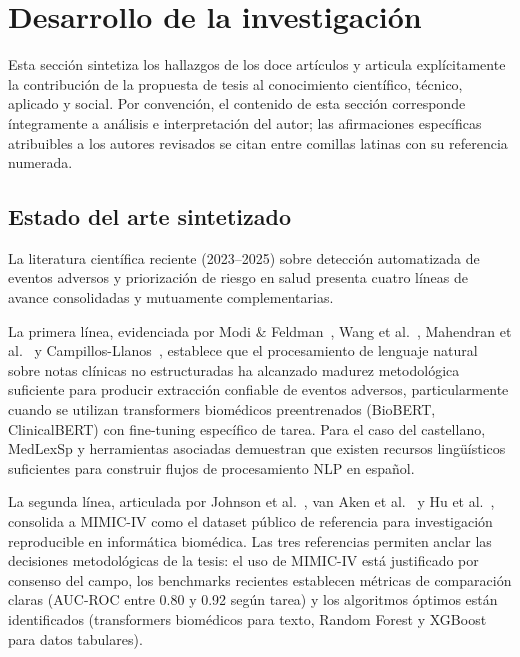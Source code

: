 \documentclass[11pt,a4paper]{article}
\begin{document}
\newpage

\section{Desarrollo de la investigación}

Esta sección sintetiza los hallazgos de los doce artículos y articula explícitamente la contribución de la propuesta de tesis al conocimiento científico, técnico, aplicado y social. Por convención, el contenido de esta sección corresponde íntegramente a análisis e interpretación del autor; las afirmaciones específicas atribuibles a los autores revisados se citan entre comillas latinas con su referencia numerada.

\subsection{Estado del arte sintetizado}

La literatura científica reciente (2023--2025) sobre detección automatizada de eventos adversos y priorización de riesgo en salud presenta cuatro líneas de avance consolidadas y mutuamente complementarias.

La primera línea, evidenciada por Modi \& Feldman~\cite{modi2024}, Wang et al.~\cite{wang2024}, Mahendran et al.~\cite{mahendran2025} y Campillos-Llanos~\cite{campillos2023}, establece que el procesamiento de lenguaje natural sobre notas clínicas no estructuradas ha alcanzado madurez metodológica suficiente para producir extracción confiable de eventos adversos, particularmente cuando se utilizan transformers biomédicos preentrenados (BioBERT, ClinicalBERT) con fine-tuning específico de tarea. Para el caso del castellano, MedLexSp y herramientas asociadas demuestran que existen recursos lingüísticos suficientes para construir flujos de procesamiento NLP en español.

La segunda línea, articulada por Johnson et al.~\cite{johnson2023}, van Aken et al.~\cite{vanaken2024} y Hu et al.~\cite{hu2024}, consolida a MIMIC-IV como el dataset público de referencia para investigación reproducible en informática biomédica. Las tres referencias permiten anclar las decisiones metodológicas de la tesis: el uso de MIMIC-IV está justificado por consenso del campo, los benchmarks recientes establecen métricas de comparación claras (AUC-ROC entre 0.80 y 0.92 según tarea) y los algoritmos óptimos están identificados (transformers biomédicos para texto, Random Forest y XGBoost para datos tabulares).
\end{document}
